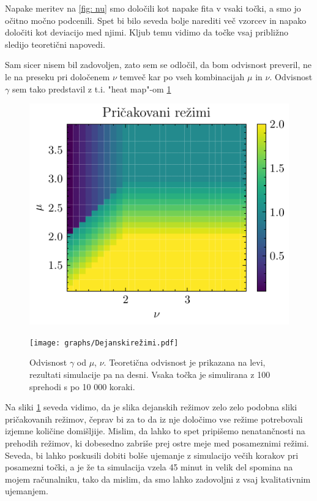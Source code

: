 \documentclass[slovene,11pt,a4paper]{article}
\begin{document}
Napake meritev na \ref{fig: nu} smo določili kot napake fita v vsaki točki, a smo jo očitno močno podcenili. Spet bi bilo seveda bolje narediti več vzorcev in napako določiti kot deviacijo med njimi. Kljub temu vidimo da točke vsaj približno sledijo teoretični napovedi.

Sam sicer nisem bil zadovoljen, zato sem se odločil, da bom odvisnost preveril, ne le na preseku pri določenem $\nu$ temveč kar po vseh kombinacijah $\mu$ in $\nu$. Odvisnost $\gamma$ sem tako predstavil z t.i. "heat map"-om \ref{fig: heat}


\begin{figure}[ht]
  \centering
  \begin{minipage}{0.48\textwidth}
    \centering
    \includegraphics[width=\linewidth]{graphs/Pričakovanirežimi.pdf}
    
  \end{minipage}%
  \hfill%
  \begin{minipage}{0.48\textwidth}
    \centering
    \texttt{[image: graphs/Dejanskirežimi.pdf]}
    
  \end{minipage}
  \caption{Odvisnost $\gamma$ od $\mu$, $\nu$. Teoretična odvisnost je prikazana na levi, rezultati simulacije pa na desni. Vsaka točka je simulirana z 100 sprehodi s po 10 000 koraki. }
  \label{fig: heat}
\end{figure}

\newpage
Na sliki \ref{fig: heat} seveda vidimo, da je slika dejanskih režimov zelo zelo podobna sliki pričakovanih režimov, čeprav bi za to da iz nje določimo vse režime potrebovali izjemne količine domišljije. Mislim, da lahko to spet pripišemo nenatančnosti na prehodih režimov, ki dobesedno zabriše prej ostre meje med posameznimi režimi. Seveda, bi lahko poskusili dobiti bolše ujemanje z simulacijo večih korakov pri posamezni točki, a je že ta simulacija vzela 45 minut in velik del spomina na mojem računalniku, tako da mislim, da smo lahko zadovoljni z vsaj kvalitativnim ujemanjem.
\end{document}
